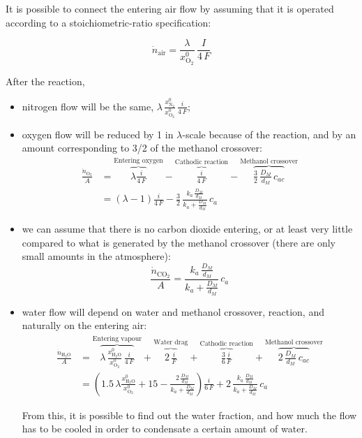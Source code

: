 \documentclass[a4paper,10pt]{article}
\newcommand{\HHO}{\ensuremath{\mathrm{H_2O}}}
\newcommand{\OO}{\ensuremath{\mathrm{O_2}}}
\newcommand{\NN}{\ensuremath{\mathrm{N_2}}}
\newcommand{\COO}{\ensuremath{\mathrm{CO_2}}}
\begin{document}
It is possible to connect the entering air flow by assuming that it is operated
according to a stoichiometric-ratio specification:

\begin{equation}
\dot n_\text{air} = \frac{\lambda}{x_\OO^0}\, \frac{I}{4\,F}
\end{equation}

After the reaction,
\begin{itemize}
\item nitrogen flow will be the same, $\lambda \, \frac{x_\NN^0}{x_\OO^0}\,
\frac{i}{4\,F}$;
\item oxygen flow will be reduced by 1 in $\lambda$-scale because of the
reaction, and by an amount corresponding to 3/2 of the methanol
crossover:
\begin{equation}
\begin{aligned}
\frac{\dot n_\OO}{A} &= \overbrace{\lambda\frac{i}{4\,F}}^\text{Entering oxygen}
- \overbrace{\frac{i}{4\,F}}^\text{Cathodic reaction}
- \overbrace{ \frac{3}{2}\,\frac{D_M}{d_M}\,c_{ac}}^\text{Methanol crossover}\\
&= (\lambda - 1) \frac{i}{4\,F} - \frac{3}{2}\,\frac{k_a\,\frac{D_M}{d_M}}
{k_a+\frac{D_M}{d_M}}\,c_a
\end{aligned}
\end{equation}
\item we can assume that there is no carbon dioxide entering, or at least very
little compared to what is generated by the methanol crossover (there are only
small amounts in the atmosphere):
\begin{equation}
\frac{\dot n_\COO}{A} = \frac{k_a\,\frac{D_M}{d_M}} {k_a+\frac{D_M}{d_M}}\,c_a
\end{equation}
\item water flow will depend on water and methanol crossover, reaction, and
naturally on the entering air:
\begin{equation}
\begin{aligned}
\frac{\dot n_\HHO}{A} & = \overbrace{\lambda \, \frac{x_\HHO^0}{x_\OO^0} \,
\frac{i}{4\,F}}^\text{Entering vapour} +
\overbrace{2\,\frac{i}{F}}^\text{Water drag} +
\overbrace{\frac{3}{6}\frac{i}{F}}^\text{Cathodic reaction}
+ \overbrace{2\,\frac{D_M}{d_M}\,c_{ac}}^\text{Methanol crossover}\\
& = \left( 1.5\,\lambda \frac{x_\HHO^0}{x_\OO^0} + 15
- \frac{2\,\frac{D_M}{d_M}}{k_a+\frac{D_M}{d_M}} \right)\frac{i}{6\,F}
+ 2\,\frac{k_a\,\frac{D_M}{d_M}}{k_a+\frac{D_M}{d_M}}\, c_a
\end{aligned}
\end{equation}

From this, it is possible to find out the water fraction, and how much the
flow has to be cooled in order to condensate a certain amount of water.

\end{itemize}
\end{document}
